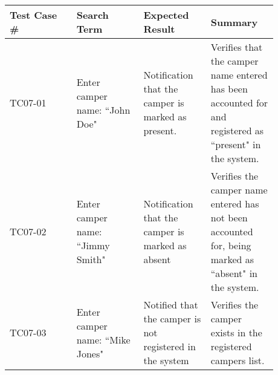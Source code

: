 \documentclass[11pt]{article}
\begin{document}
\begin{center}
\begin{longtable}{|p{0.22\linewidth}|p{0.22\linewidth}|p{0.22\linewidth}|p{0.22\linewidth}|}
	\hline
	Test Case \# & Search Term & Expected Result & Summary\\\hline
	TC07-01 & Enter camper name: ``John Doe" & Notification that the camper is marked as present. & Verifies that the camper name entered has been accounted for and registered as ``present" in the system.\vspace*{1em}\\\hline
	TC07-02 & Enter camper name: ``Jimmy Smith" & Notification that the camper is marked as absent& Verifies the camper name entered has not been accounted for, being marked as ``absent" in the system.\vspace*{1em}\\	\hline
	TC07-03 & Enter camper name: ``Mike Jones" & Notified that the camper is not registered in the system & Verifies the camper exists in the registered campers list. \vspace*{1em}\\\hline
\end{longtable}
\end{center}
\clearpage
\end{document}
